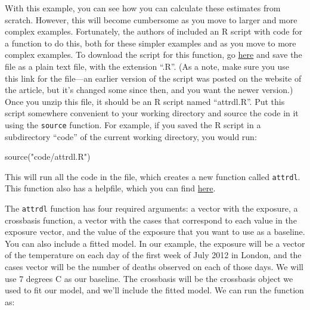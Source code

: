 \documentclass[
]{book}
\newenvironment{Shaded}{\begin{snugshade}}{\end{snugshade}}
\newcommand{\AttributeTok}[1]{\textcolor[rgb]{0.77,0.63,0.00}{#1}}
\newcommand{\DecValTok}[1]{\textcolor[rgb]{0.00,0.00,0.81}{#1}}
\newcommand{\FunctionTok}[1]{\textcolor[rgb]{0.00,0.00,0.00}{#1}}
\newcommand{\NormalTok}[1]{#1}
\newcommand{\SpecialCharTok}[1]{\textcolor[rgb]{0.00,0.00,0.00}{#1}}
\newcommand{\StringTok}[1]{\textcolor[rgb]{0.31,0.60,0.02}{#1}}
\begin{document}
With this example, you can see how you can calculate these estimates from scratch. However, this will become cumbersome as you move to larger and more complex examples. Fortunately, the authors of \citet{gasparrini2014attributable} included an R script with code for a function to do this, both for these simpler examples and as you move to more complex examples. To download the script for this function, go \href{https://raw.githubusercontent.com/gasparrini/2014_gasparrini_BMCmrm_Rcodedata/master/attrdl.R}{here} and save the file as a plain text file, with the extension ``.R''. (As a note, make sure you use this link for the file---an earlier version of the script was posted on the website of the article, but it's changed some since then, and you want the newer version.) Once you unzip this file, it should be an R script named ``attrdl.R''. Put this script somewhere convenient to your working directory and source the code in it using the \texttt{source} function. For example, if you saved the R script in a subdirectory ``code'' of the current working directory, you would run:

\begin{Shaded}
\begin{Highlighting}[]
\FunctionTok{source}\NormalTok{(}\StringTok{"code/attrdl.R"}\NormalTok{)}
\end{Highlighting}
\end{Shaded}

This will run all the code in the file, which creates a new function called \texttt{attrdl}. This function also has a helpfile, which you can find \href{https://static-content.springer.com/esm/art\%3A10.1186\%2F1471-2288-14-55/MediaObjects/12874_2014_1076_MOESM2_ESM.pdf}{here}.

The \texttt{attrdl} function has four required arguments: a vector with the exposure, a crossbasis function, a vector with the cases that correspond to each value in the exposure vector, and the value of the exposure that you want to use as a baseline. You can also include a fitted model. In our example, the exposure will be a vector of the temperature on each day of the first week of July 2012 in London, and the cases vector will be the number of deaths observed on each of those days. We will use 7 degrees C as our baseline. The crossbasis will be the crossbasis object we used to fit our model, and we'll include the fitted model. We can run the function as:

\begin{Shaded}
\end{Shaded}
\end{document}
